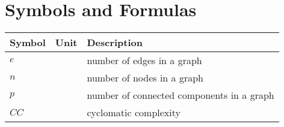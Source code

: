 \cleardoublepage
\section*{Symbols and Formulas}


\begin{table}[h!]
\begin{tabularx}{\linewidth}{p{2cm} p{1cm} X}
\textbf{Symbol} & \textbf{Unit} & \textbf{Description} \\
\hline\hline
$e$             &               & number of edges in a graph\\
$n$             &               & number of nodes in a graph\\
$p$             &               & number of connected components in a graph\\
$CC$            &               & cyclomatic complexity\\
\end{tabularx}
\end{table}
